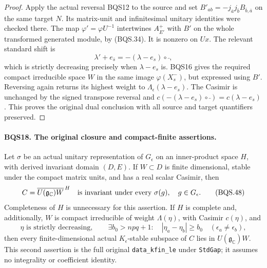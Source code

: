 \begin{proof}
Apply the actual reversal BQS12 to the source and set
$B'_{ab}=-j_{\bar a}j_{\bar b}B_{\bar b,\bar a}$ on the same target
$N$.  Its matrix-unit and infinitesimal unitary identities were checked
there.  The map
$\varphi'=\varphi U^{-1}$ intertwines $A^+_{E'}$ with $B'$ on
the whole transformed generated module, by (BQS.34).
It is nonzero on $Ux$.
The relevant standard shift is
\[
            \lambda'+e_{\bar s}
                     =-(\lambda-e_s)\circ\bar{\ },
 \tag{BQS.47}
\]
which is strictly decreasing precisely when $\lambda-e_s$ is.
BQS16 gives the required compact irreducible space $W$ in the same
image $\varphi(X_s^-)$, but expressed using $B'$.
Reversing again returns its highest weight to
$\Lambda_\epsilon(\lambda-e_s)$.
The Casimir is unchanged by the signed transpose reversal and
$c(-(\lambda-e_s)\circ\bar{\ })=c(\lambda-e_s)$.
This proves the original dual conclusion with all source and target
quantifiers preserved.
\end{proof}

\paragraph{BQS18. The original closure and compact-finite assertions.}
\label{claim:BQS18}
Let $\sigma$ be an actual unitary representation of $G_\epsilon$ on
an inner-product space $H$, with derived invariant domain $(D,E)$.
If $W\subset D$ is finite dimensional, stable under the compact
matrix units, and has a real scalar Casimir, then
\[
 C=\overline{U(\mathfrak g_{\mathbb C})W}^{\,H}
                 \quad\hbox{is invariant under every }\sigma(g),
                 \quad g\in G_\epsilon .
 \tag{BQS.48}
\]
Completeness of $H$ is unnecessary for this assertion.
If $H$ is complete and, additionally, $W$ is compact irreducible
of weight $\Lambda(\eta)$, with Casimir $c(\eta)$, and
\[
 \eta\text{ is strictly decreasing},\qquad
 \exists b_0>npq+1:\quad
 |\eta_a-\eta_b|\ge b_0\quad(\epsilon_a\ne\epsilon_b),
 \tag{BQS.49}
\]
then every
finite-dimensional actual $K_\epsilon$-stable subspace of $C$
lies in $U(\mathfrak g_{\mathbb C})W$.
This second assertion is the full original \texttt{data\_kfin\_le}
under \texttt{StdGap}; it assumes no integrality or coefficient identity.

